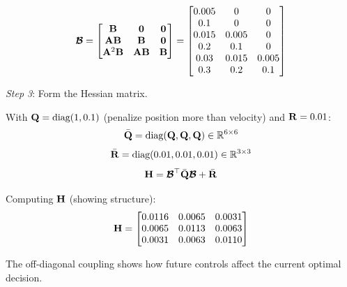 \begin{examplebox}
\begin{equation}
    \boldsymbol{\mathcal{B}} = \begin{bmatrix}
        \mathbf{B} & \mathbf{0} & \mathbf{0} \\
        \mathbf{A}\mathbf{B} & \mathbf{B} & \mathbf{0} \\
        \mathbf{A}^2\mathbf{B} & \mathbf{A}\mathbf{B} & \mathbf{B}
    \end{bmatrix} =
    \begin{bmatrix}
        0.005 & 0 & 0 \\
        0.1 & 0 & 0 \\
        0.015 & 0.005 & 0 \\
        0.2 & 0.1 & 0 \\
        0.03 & 0.015 & 0.005 \\
        0.3 & 0.2 & 0.1
    \end{bmatrix}
\end{equation}

\textit{Step 3}: Form the Hessian matrix.

With $\mathbf{Q} = \text{diag}(1, 0.1)$ (penalize position more than velocity) and $\mathbf{R} = 0.01$:
\begin{equation}
    \bar{\mathbf{Q}} = \text{diag}(\mathbf{Q}, \mathbf{Q}, \mathbf{Q}) \in \mathbb{R}^{6 \times 6}
\end{equation}
\begin{equation}
    \bar{\mathbf{R}} = \text{diag}(0.01, 0.01, 0.01) \in \mathbb{R}^{3 \times 3}
\end{equation}
\begin{equation}
    \mathbf{H} = \boldsymbol{\mathcal{B}}^\top \bar{\mathbf{Q}} \boldsymbol{\mathcal{B}} + \bar{\mathbf{R}}
\end{equation}

Computing $\mathbf{H}$ (showing structure):
\begin{equation}
    \mathbf{H} = \begin{bmatrix}
        0.0116 & 0.0065 & 0.0031 \\
        0.0065 & 0.0113 & 0.0063 \\
        0.0031 & 0.0063 & 0.0110
    \end{bmatrix}
\end{equation}

The off-diagonal coupling shows how future controls affect the current optimal decision.
\end{examplebox}

